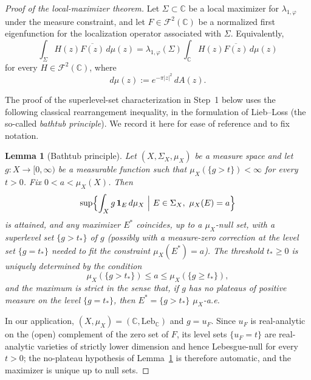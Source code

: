 \documentclass[a4paper,11pt,reqno]{amsart}
\numberwithin{equation}{section}
\theoremstyle{plain} %
\newtheorem{lemma}{Lemma}[section]
\theoremstyle{definition} %
\theoremstyle{remark}
\newcommand{\C}{\mathbb{C}}
\begin{document}
\begin{proof}[Proof of the local-maximizer theorem]
Let \(\Sigma\subset \C\) be a local maximizer for \(\lambda_{1,\varphi}\) under
the measure constraint, and let \(F\in \mathcal F^2(\C)\) be a normalized first
eigenfunction for the localization operator associated with \(\Sigma\).
Equivalently,
\begin{equation}\label{eq:eigenvalue-equation}
\int_\Sigma H(z)\overline{F(z)}\,d\mu(z)
=
\lambda_{1,\varphi}(\Sigma)\int_\C H(z)\overline{F(z)}\,d\mu(z)
\end{equation}
for every \(H\in \mathcal F^2(\C)\), where
\[
d\mu(z):=e^{-\pi |z|^2}\,dA(z).
\]

The proof of the superlevel-set characterization in Step~1 below uses the
following classical rearrangement inequality, in the formulation of
Lieb--Loss \cite[Theorem~1.14]{Lieb-Loss} (the so-called
\emph{bathtub principle}). We record it here for ease of reference and to fix
notation.

\begin{lemma}[Bathtub principle]\label{lem:bathtub}
Let \((X,\Sigma_X,\mu_X)\) be a measure space and let
\(g\colon X\to[0,\infty)\) be a measurable function such that
\(\mu_X(\{g>t\})<\infty\) for every \(t>0\). Fix \(0<a<\mu_X(X)\). Then
\begin{equation}\label{eq:bathtub-equation}
\sup\Bigl\{\int_X g\,\mathbf 1_E\,d\mu_X\ \Big|\ E\in\Sigma_X,\ \mu_X(E)=a\Bigr\}
\end{equation}
is attained, and any maximizer \(E^\ast\) coincides, up to a \(\mu_X\)-null
set, with a superlevel set \(\{g>t_\ast\}\) of \(g\) (possibly with a
measure-zero correction at the level set \(\{g=t_\ast\}\) needed to fit the
constraint \(\mu_X(E^\ast)=a\)). The threshold \(t_\ast\ge 0\) is uniquely
determined by the condition
\[
\mu_X(\{g>t_\ast\})\le a\le \mu_X(\{g\ge t_\ast\}),
\]
and the maximum is strict in the sense that, if \(g\) has no plateaus of
positive measure on the level \(\{g=t_\ast\}\), then \(E^\ast=\{g>t_\ast\}\)
\(\mu_X\)-a.e.
\end{lemma}

In our application, \((X,\mu_X)=(\C,\mathrm{Leb}_\C)\) and \(g=u_F\). Since
\(u_F\) is real-analytic on the (open) complement of the zero set of \(F\),
its level sets \(\{u_F=t\}\) are real-analytic varieties of strictly lower
dimension and hence Lebesgue-null for every \(t>0\); the no-plateau
hypothesis of Lemma~\ref{lem:bathtub} is therefore automatic, and the
maximizer is unique up to null sets.


\end{proof}
\end{document}
